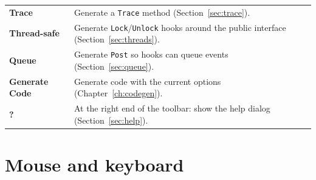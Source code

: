\documentclass[11pt,a4paper,openany]{report}
\newcommand{\ui}[1]{\textsf{\textbf{#1}}}
\newcommand{\code}[1]{\texttt{#1}}
\begin{document}
\begin{longtable}{@{}p{3.1cm}p{11.3cm}@{}}
\ui{Trace}         & Generate a \code{Trace} method (Section~\ref{sec:trace}). \\
\ui{Thread-safe}   & Generate \code{Lock}/\code{Unlock} hooks around the public interface (Section~\ref{sec:threads}). \\
\ui{Queue}         & Generate \code{Post} so hooks can queue events (Section~\ref{sec:queue}). \\
\ui{Generate Code} & Generate code with the current options (Chapter~\ref{ch:codegen}). \\
\ui{?}             & At the right end of the toolbar: show the help dialog (Section~\ref{sec:help}). \\
\bottomrule
\end{longtable}

\section{Mouse and keyboard}
\end{document}
